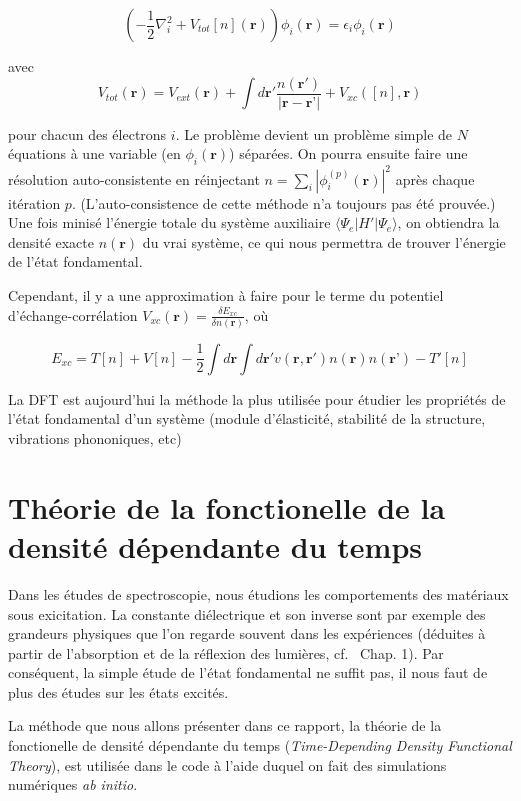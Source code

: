 $$
(-\frac{1}{2}\nabla_i^2 + V_{tot}[n](\textbf{r}))\phi_i(\textbf{r}) = \epsilon_i \phi_i (\textbf{r})
$$

avec
\begin{equation}\label{Vtot}
V_{tot}(\textbf{r}) = V_{ext}(\textbf{r}) + \int d\textbf{r}' \frac{n(\textbf{r}')}{|\textbf{r} - \textbf{r'}|} + V_{xc}([n], \textbf{r})
\end{equation}

pour chacun des électrons $i$. Le problème devient un problème simple de $N$ équations à une variable (en $\phi_i(\textbf{r})$) séparées. On pourra ensuite faire une résolution auto-consistente en réinjectant $n = \sum_i |\phi_i^{(p)}(\textbf{r})|^2 $ après chaque itération $p$. (L'auto-consistence de cette méthode n'a toujours pas été prouvée.) Une fois minisé l'énergie totale du système auxiliaire $\langle \Psi_e | H' | \Psi_e \rangle $, on obtiendra la densité exacte $n(\textbf{r})$ du vrai système, ce qui nous permettra de trouver l'énergie de l'état fondamental.

Cependant, il y a une approximation à faire pour le terme du potentiel d'échange-corrélation $V_{xc}(\textbf{r}) = \frac{\delta E_{xc}}{\delta n(\textbf{r})}$, où

\begin{equation}
\label{eqn-exc}
  E_{xc} = T[n] + V[n] - \frac{1}{2}\int d\textbf{r}
  \int d\textbf{r}' v(\textbf{r}, \textbf{r}') n(\textbf{r}) n(\textbf{r'}) - T'[n]
\end{equation}

La DFT est aujourd'hui la méthode la plus utilisée pour étudier les propriétés de l'état fondamental d'un système (module d'élasticité, stabilité de la structure, vibrations phononiques, etc)~\cite{Martin2004}

\section{Théorie de la fonctionelle de la densité dépendante du temps}\label{sec-TDDFT}
Dans les études de spectroscopie, nous étudions les comportements des matériaux sous exicitation. La constante diélectrique et son inverse sont par exemple des grandeurs physiques que l'on regarde souvent dans les expériences (déduites à partir de l'absorption et de la réflexion des lumières, cf.~\cite{Sottile2003} Chap. 1). Par conséquent, la simple étude de l'état fondamental ne suffit pas, il nous faut de plus des études sur les états excités.

La méthode que nous allons présenter dans ce rapport, la théorie de la fonctionelle de densité dépendante du temps (\textit{Time-Depending Density Functional Theory}), est utilisée dans le code à l'aide duquel on fait des simulations numériques \textit{ab initio}.

